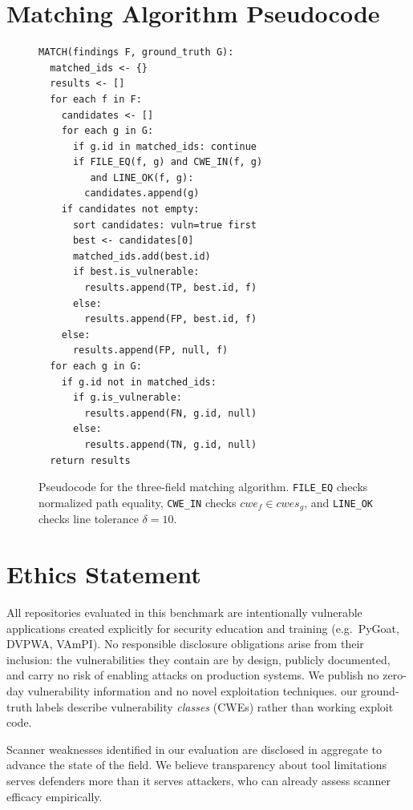 \section{Matching Algorithm Pseudocode}
\label{sec:matching-pseudocode}

\begin{figure}[h]
{\footnotesize
\begin{verbatim}
MATCH(findings F, ground_truth G):
  matched_ids <- {}
  results <- []
  for each f in F:
    candidates <- []
    for each g in G:
      if g.id in matched_ids: continue
      if FILE_EQ(f, g) and CWE_IN(f, g)
         and LINE_OK(f, g):
        candidates.append(g)
    if candidates not empty:
      sort candidates: vuln=true first
      best <- candidates[0]
      matched_ids.add(best.id)
      if best.is_vulnerable:
        results.append(TP, best.id, f)
      else:
        results.append(FP, best.id, f)
    else:
      results.append(FP, null, f)
  for each g in G:
    if g.id not in matched_ids:
      if g.is_vulnerable:
        results.append(FN, g.id, null)
      else:
        results.append(TN, g.id, null)
  return results
\end{verbatim}
}
\caption{Pseudocode for the three-field matching algorithm. \texttt{FILE\_EQ} checks normalized path equality, \texttt{CWE\_IN} checks $\mathit{cwe}_f \in \mathit{cwes}_g$, and \texttt{LINE\_OK} checks line tolerance $\delta=10$.}
\label{alg:matching}
\end{figure}

\section{Ethics Statement}

All repositories evaluated in this benchmark are intentionally vulnerable
applications created explicitly for security education and training (e.g.\
PyGoat, DVPWA, VAmPI).  No responsible disclosure obligations arise from their
inclusion: the vulnerabilities they contain are by design, publicly documented,
and carry no risk of enabling attacks on production systems.  We publish no
zero-day vulnerability information and no novel exploitation techniques.
our ground-truth labels describe vulnerability \emph{classes} (CWEs) rather
than working exploit code.

Scanner weaknesses identified in our evaluation are disclosed in aggregate to
advance the state of the field.  We believe transparency about tool limitations
serves defenders more than it serves attackers, who can already assess scanner
efficacy empirically.

